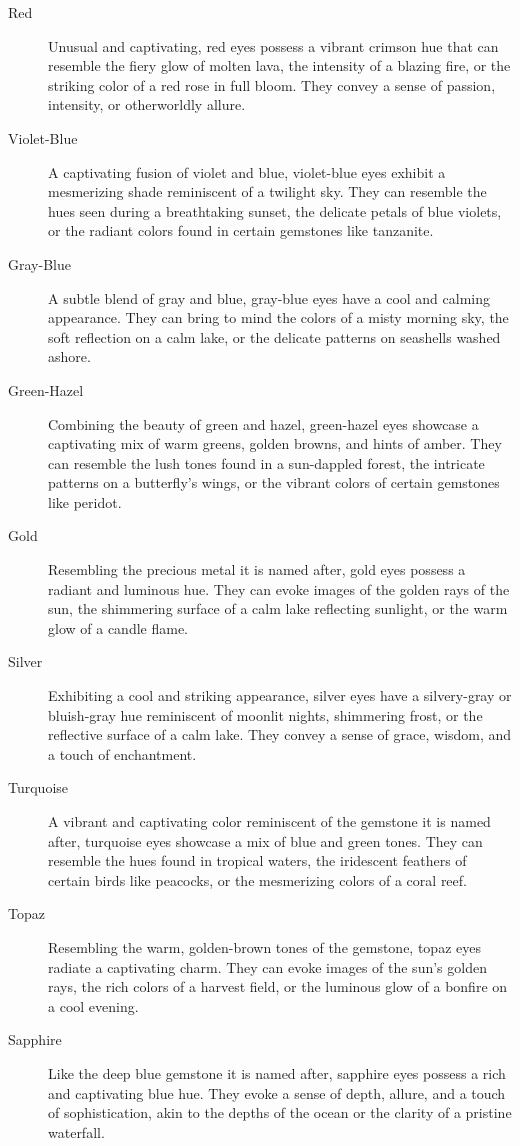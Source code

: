 \documentclass[12pt]{book}  %
\begin{document}
\begin{description}
    \item[Red] Unusual and captivating, red eyes possess a vibrant crimson hue that can resemble the fiery glow of molten lava, the intensity of a blazing fire, or the striking color of a red rose in full bloom. They convey a sense of passion, intensity, or otherworldly allure.
    \item[Violet-Blue] A captivating fusion of violet and blue, violet-blue eyes exhibit a mesmerizing shade reminiscent of a twilight sky. They can resemble the hues seen during a breathtaking sunset, the delicate petals of blue violets, or the radiant colors found in certain gemstones like tanzanite.
    \item[Gray-Blue] A subtle blend of gray and blue, gray-blue eyes have a cool and calming appearance. They can bring to mind the colors of a misty morning sky, the soft reflection on a calm lake, or the delicate patterns on seashells washed ashore.
    \item[Green-Hazel] Combining the beauty of green and hazel, green-hazel eyes showcase a captivating mix of warm greens, golden browns, and hints of amber. They can resemble the lush tones found in a sun-dappled forest, the intricate patterns on a butterfly's wings, or the vibrant colors of certain gemstones like peridot.
    \item[Gold] Resembling the precious metal it is named after, gold eyes possess a radiant and luminous hue. They can evoke images of the golden rays of the sun, the shimmering surface of a calm lake reflecting sunlight, or the warm glow of a candle flame.
    \item[Silver] Exhibiting a cool and striking appearance, silver eyes have a silvery-gray or bluish-gray hue reminiscent of moonlit nights, shimmering frost, or the reflective surface of a calm lake. They convey a sense of grace, wisdom, and a touch of enchantment.
    \item[Turquoise] A vibrant and captivating color reminiscent of the gemstone it is named after, turquoise eyes showcase a mix of blue and green tones. They can resemble the hues found in tropical waters, the iridescent feathers of certain birds like peacocks, or the mesmerizing colors of a coral reef.
    \item[Topaz] Resembling the warm, golden-brown tones of the gemstone, topaz eyes radiate a captivating charm. They can evoke images of the sun's golden rays, the rich colors of a harvest field, or the luminous glow of a bonfire on a cool evening.
    \item[Sapphire] Like the deep blue gemstone it is named after, sapphire eyes possess a rich and captivating blue hue. They evoke a sense of depth, allure, and a touch of sophistication, akin to the depths of the ocean or the clarity of a pristine waterfall.

\end{description}
\end{document}
